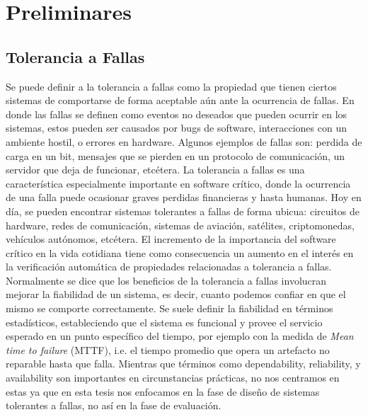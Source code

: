 \chapter{Preliminares}
\label{cap:preliminares}
\section{Tolerancia a Fallas}
Se puede definir a la tolerancia a fallas como la propiedad que tienen ciertos sistemas de comportarse de forma aceptable aún ante la ocurrencia de fallas. En donde las fallas se definen como eventos no deseados que pueden ocurrir en los sistemas, estos pueden ser causados por bugs de software, interacciones con un ambiente hostil, o errores en hardware. Algunos ejemplos de fallas son: perdida de carga en un bit, mensajes que se pierden en un protocolo de comunicación, un servidor que deja de funcionar, etcétera.
La tolerancia a fallas es una característica especialmente importante en software crítico, donde la ocurrencia de una falla puede ocasionar graves perdidas financieras y hasta humanas.
Hoy en día, se pueden encontrar sistemas tolerantes a fallas de forma ubicua: circuitos de hardware, redes de comunicación, sistemas de aviación, satélites, criptomonedas, vehículos autónomos, etcétera.
El incremento de la importancia del software crítico en la vida cotidiana tiene como consecuencia un aumento en el interés en la verificación automática de propiedades relacionadas a tolerancia a fallas.
Normalmente se dice que los beneficios de la tolerancia a fallas involucran mejorar la fiabilidad de un sistema, es decir, cuanto podemos confiar en que el mismo se comporte correctamente. Se suele definir la fiabilidad en términos estadísticos, estableciendo que el sistema es funcional y provee el servicio esperado en un punto específico del tiempo, por ejemplo con la medida de \emph{Mean time to failure} 
 (MTTF), i.e. el tiempo promedio que opera un artefacto no reparable hasta que falla. Mientras que términos como
dependability, reliability, y availability son importantes en circunstancias prácticas,
no nos centramos en estas ya que en esta tesis nos enfocamos en la fase de diseño de sistemas tolerantes a fallas, no así en la fase de evaluación.

